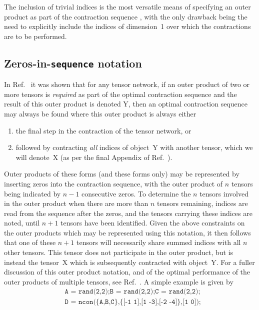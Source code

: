 \documentclass[aps,prb,reprint,superscriptaddress,amsmath,amsfonts]{revtex4-1}
\theoremstyle{definition}
\newcommand{\rcite}[1]{Ref.~\onlinecite{#1}}
\newcommand{\ttt}[1]{\texttt{#1}}
\newcommand{\Q}{Y}
\begin{document}
The inclusion of trivial indices %
is the most versatile means of specifying an outer product %
as part of the contraction sequence%
, with the only drawback being the need to explicitly include the indices of dimension~1 over which the contractions are to be performed.




\subsection{Zeros-in-\ttt{sequence} notation\label{sec:zis}}


In %
\rcite{pfeifer2013a} it was shown that for any tensor network, if an outer product of two or more tensors is \emph{required} as part of the optimal contraction sequence and the result of this outer product is denoted \Q{}, then an optimal contraction sequence may always be found where this outer product is always either
\begin{enumerate}
\item the final step in the contraction of the tensor network, or
\item followed by contracting \emph{all} indices of object~\Q{} with another tensor, which we will denote~X (as per the final Appendix of \rcite{pfeifer2013a}).
\end{enumerate}
Outer products of these forms (and these forms only) may be represented %
by inserting zeros into the contraction sequence, with the outer product of $n$ tensors being indicated by $n-1$ consecutive zeros. To determine the $n$ tensors involved in the outer product when there are more than $n$ tensors remaining, indices are read from the sequence after the zeros, and the tensors carrying these indices are noted, until $n+1$ tensors have been identified. Given the above constraints on the outer products which may be represented using this notation, it then follows that %
one of these $n+1$ tensors will necessarily share summed indices with all $n$ other tensors. This tensor does not participate in the outer product, but is instead the tensor~X which is subsequently contracted with object~\Q{}. For a fuller discussion of this outer product notation, and of the optimal performance of the outer products of multiple tensors, see \rcite{pfeifer2013a}. %
A simple example is given by
\begin{align*}
&\ttt{A = rand(2,2);B = rand(2,2);C = rand(2,2);}\\
&\ttt{D = ncon(\{A,B,C\},\{[-1 1],[1 -3],[-2 -4]\},[1 0]);}
\end{align*}
\end{document}
